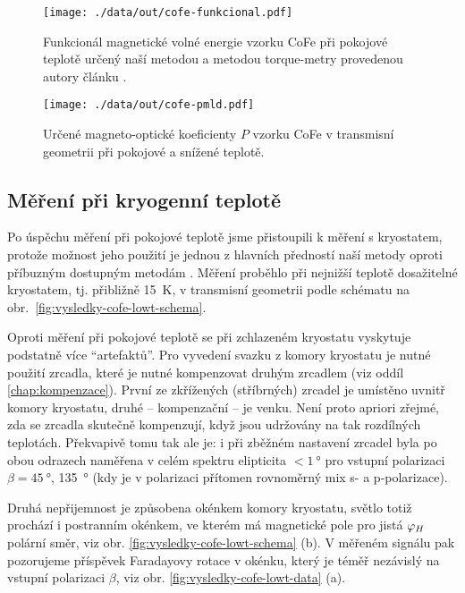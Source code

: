 \begin{figure}[htbp]
    \centering
    \texttt{[image: ./data/out/cofe-funkcional.pdf]}
    \caption{Funkcionál magnetické volné energie vzorku CoFe při pokojové teplotě určený naší metodou a metodou torque-metry provedenou autory článku \cite{zengIntrinsicMechanismAnisotropic2020}.}
    \label{fig:cofe-funkcional}
\end{figure}

\begin{figure}[htbp]
    \centering
    \texttt{[image: ./data/out/cofe-pmld.pdf]}
    \caption{Určené magneto-optické koeficienty $P$ vzorku CoFe v transmisní geometrii při pokojové a snížené teplotě.}
    \label{fig:vysledky-cofe-PMLD}
\end{figure}



\subsection{Měření při kryogenní teplotě}
\label{chap:vysledky-cofe-lowt}

Po úspěchu měření při pokojové teplotě jsme přistoupili k měření s kryostatem, protože možnost jeho použití je jednou z hlavních předností naší metody oproti příbuzným dostupným metodám \cite{hamrleHugeQuadraticMagnetooptical2007,liangQuantitativeStudyQuadratic2015,silberQuadraticMagnetoopticKerr2019}.
Měření proběhlo při nejnižší teplotě dosažitelné kryostatem, tj. přibližně \SI{15}{\kelvin}, v transmisní geometrii podle schématu na obr.~\ref{fig:vysledky-cofe-lowt-schema}.

Oproti měření při pokojové teplotě se při zchlazeném kryostatu vyskytuje podstatně více ``artefaktů''.
Pro vyvedení svazku z komory kryostatu je nutné použití zrcadla, které je nutné kompenzovat druhým zrcadlem (viz oddíl \ref{chap:kompenzace}).
První ze zkřížených (stříbrných) zrcadel je umístěno uvnitř komory kryostatu, druhé -- kompenzační -- je venku.
Není proto apriori zřejmé, zda se zrcadla skutečně kompenzují, když jsou udržovány na tak rozdílných teplotách.
Překvapivě tomu tak ale je: i při zběžném nastavení zrcadel byla po obou odrazech naměřena v celém spektru elipticita $<\SI{1}{\degree}$ pro vstupní polarizaci $\beta=\SI{45}{\degree}$, \SI{135}{\degree} (kdy je v polarizaci přítomen rovnoměrný mix s- a p-polarizace).

Druhá nepřijemnost je způsobena okénkem komory kryostatu, světlo totiž prochází i postranním okénkem, ve kterém má magnetické pole pro jistá $\varphi_H$ polární směr, viz obr. \ref{fig:vysledky-cofe-lowt-schema} (b).
V měřeném signálu pak pozorujeme příspěvek Faradayovy rotace v okénku, který je téměř nezávislý na vstupní polarizaci $\beta$, viz obr. \ref{fig:vysledky-cofe-lowt-data} (a).

